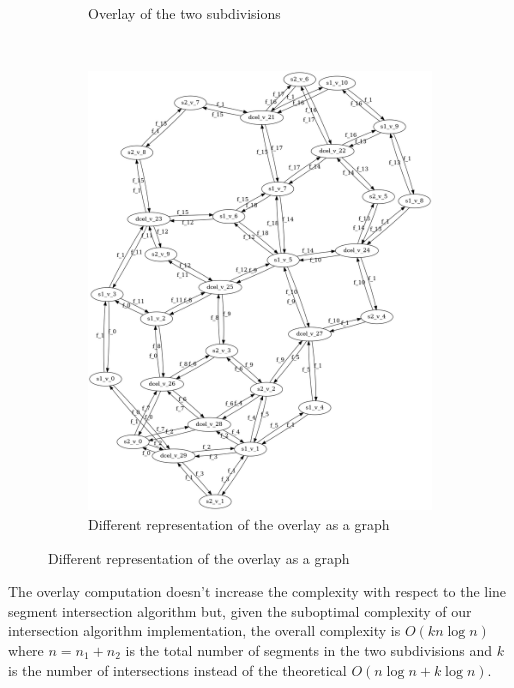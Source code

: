 \begin{figure}[H]
\begin{subfigure}{0.5\textwidth}
        \caption{Overlay of the two subdivisions}
        \label{fig:overlay_result}
    \end{subfigure}\\
    \break
    \begin{subfigure}{\textwidth}
        \centering
        \includegraphics[width=0.5\linewidth]{images/test_1_test_2_graph.png}
        \caption{Different representation of the overlay as a graph}
        \label{fig:overlay_faces}
    \end{subfigure}
\end{figure}

The overlay computation doesn't increase the complexity with respect to the line segment intersection algorithm but, given the suboptimal complexity of our intersection algorithm implementation, the overall complexity is $O(kn\log n)$ where $n = n_1 + n_2$ is the total number of segments in the two subdivisions and $k$ is the number of intersections instead of the theoretical $O(n\log n + k\log n)$.
